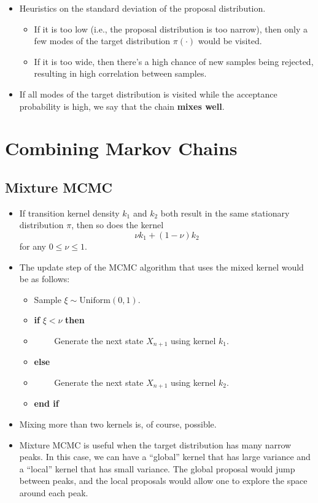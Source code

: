 \documentclass[10pt]{article}
\newcommand{\mrm}[1]{\mathrm{#1}}
\begin{document}
\begin{itemize}
  \item Heuristics on the standard deviation of the proposal distribution.
  \begin{itemize}
    \item If it is too low (i.e., the proposal distribution is too narrow), then only a few modes of the target distribution $\pi(\cdot)$ would be visited.
    \item If it is too wide, then there's a high chance of new samples being rejected, resulting in high correlation between samples.
  \end{itemize}

  \item If all modes of the target distribution is visited while the acceptance probability is high, we say that the chain {\bf mixes well}.
\end{itemize}

\section{Combining Markov Chains}

\subsection{Mixture MCMC}

\begin{itemize}
  \item If transition kernel density $k_1$ and $k_2$ both result in the same stationary distribution $\pi$, then so does the kernel $$\nu k_1 + (1 - \nu)k_2$$ for any $0 \leq \nu \leq 1$.
  
  \item The update step of the MCMC algorithm that uses the mixed kernel would be as follows:
  \begin{itemize}
    \item[] Sample $\xi \sim \mrm{Uniform}(0,1)$.
    \item[] {\bf if} $\xi < \nu$ {\bf then}
    \item[] $\qquad$ Generate the next state $X_{n+1}$ using kernel $k_1$.
    \item[] {\bf else}
    \item[] $\qquad$ Generate the next state $X_{n+1}$ using kernel $k_2$.
    \item[] {\bf end if}
  \end{itemize}

  \item Mixing more than two kernels is, of course, possible.

  \item Mixture MCMC is useful when the target distribution has many narrow peaks. In this case, we can have a ``global'' kernel that has large variance and a ``local'' kernel that has small variance. The global proposal would jump between peaks, and the local proposals would allow one to explore the space around each peak.
\end{itemize}
\end{document}
